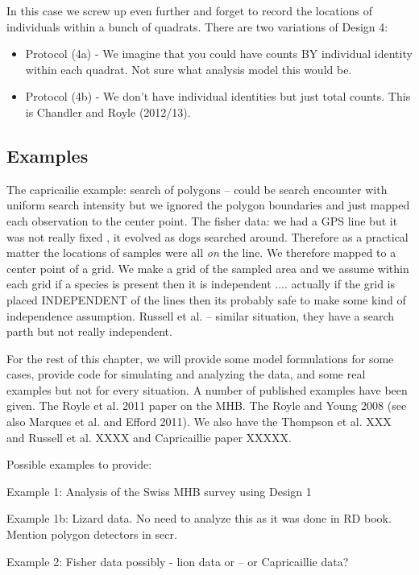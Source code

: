 In this
case we screw up even further and forget to record the locations of
individuals within a bunch of quadrats. 
There are two variations of Design 4:
\begin{itemize}
\item[] Protocol (4a) - We imagine that you could have
counts BY individual identity within each quadrat. Not sure what
analysis model this would be.
\item[] Protocol (4b) - We don't have 
individual identities but just total counts. This is Chandler and
Royle (2012/13).
\end{itemize}


\subsection{Examples}

The capricailie example: search of polygons -- could be search
encounter with uniform search intensity but we ignored the polygon
boundaries and just mapped each observation to the center point.  The
fisher data: we had a GPS line but it was not really fixed , it
evolved as dogs searched around. Therefore as a practical matter the
locations of samples were all {\it on} the line. We therefore mapped
to a center point of a grid. We make a grid of the sampled area and we
assume within each grid if a species is present then it is independent
.... actually if the grid is placed INDEPENDENT of the lines then its
probably safe to make some kind of independence assumption.  Russell
et al. -- similar situation, they have a search parth but not really
independent.

For the rest of this chapter, we will provide some model
formulations for some cases, provide code for simulating and analyzing
the data, and some real examples but not for every situation. 
A number of published examples have been given. The Royle et al. 2011
paper on the MHB. The Royle and Young 2008 (see also Marques et
al. and Efford 2011). We also have the Thompson et al. XXX and Russell
et al. XXXX and Capricaillie paper XXXXX.

Possible examples to provide:

Example 1:  Analysis of the Swiss MHB survey using Design 1

Example 1b: Lizard data. No need to analyze this as it was done in RD book. Mention polygon detectors in secr.

Example 2: Fisher data possibly - lion data or -- or  Capricaillie data?


